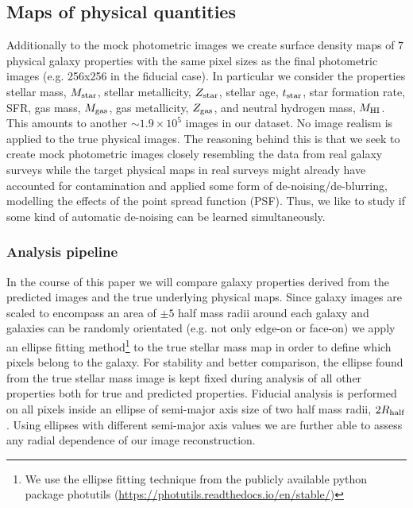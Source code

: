 \documentclass[useAMS,usenatbib]{mnras}
\begin{document}
\subsection{Maps of physical quantities}

Additionally to the mock photometric images we create surface density maps of $7$ physical galaxy properties with the same pixel sizes as the final photometric images (e.g. 256x256 in the fiducial case). In particular we consider the properties stellar mass, $M_{\rm star}$, stellar metallicity, $Z_{\rm star}$, stellar age, $t_{\rm star}$, star formation rate, SFR, gas mass, $M_{\rm gas}$, gas metallicity, $Z_{\rm gas}$, and neutral hydrogen mass, $M_{\rm HI}$. This amounts to another $\sim 1.9\times 10^5$ images in our dataset. No image realism is applied to the true physical images. The reasoning behind this is that we seek to create mock photometric images closely resembling the data from real galaxy surveys while the target physical maps in real surveys might already have accounted for contamination and applied some form of de-noising/de-blurring, modelling the effects of the point spread function (PSF). Thus, we like to study if some kind of automatic de-noising can be learned simultaneously. 

\subsubsection{Analysis pipeline}
\label{subsec:analysis}

In the course of this paper we will compare galaxy properties derived from the predicted images and the true underlying physical maps. Since galaxy images are scaled to encompass an area of $\pm5$ half mass radii around each galaxy and galaxies can be randomly orientated (e.g. not only edge-on or face-on) we apply an ellipse fitting method\footnote{We use the ellipse fitting technique from the publicly available python package photutils (\href{https://photutils.readthedocs.io/en/stable/}{https://photutils.readthedocs.io/en/stable/})} to the true stellar mass map in order to define which pixels belong to the galaxy. For stability and better comparison, the ellipse found from the true stellar mass image is kept fixed during analysis of all other properties both for true and predicted properties. Fiducial analysis is performed on all pixels inside an ellipse of semi-major axis size of two half mass radii, $2R_{\rm half}$. Using ellipses with different semi-major axis values we are further able to assess any radial dependence of our image reconstruction. 
\end{document}
